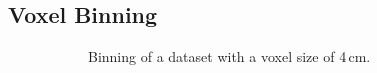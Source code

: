 \subsection{Voxel Binning} \label{contributions:usar:binning}
\begin{figure}
\centering
\begin{subfigure}[b]{0.28\textwidth}
    \caption{Binning of a dataset with a voxel size of 4\,cm.}
    \label{contributions:usar:binning:4}
\end{subfigure}
\hspace*{5mm}
\begin{subfigure}[b]{0.28\textwidth}

\end{subfigure}
\end{figure}
